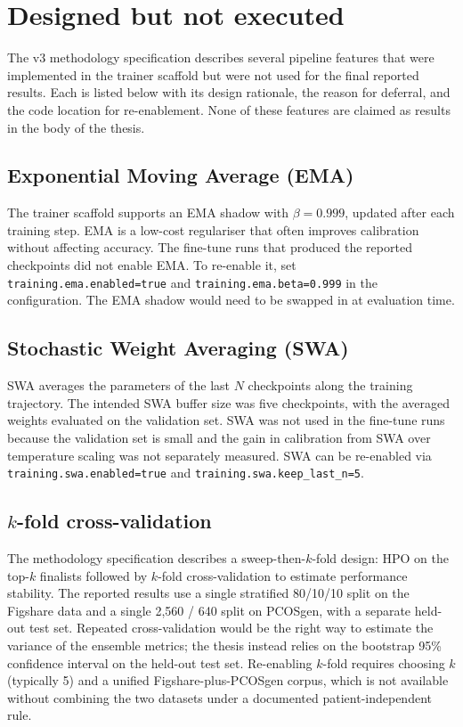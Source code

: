 \documentclass[../preamble.tex]{subfiles}
\begin{document}
\chapter{Designed but not executed}
\label{app:designed-not-executed}

The v3 methodology specification describes several pipeline features that
were implemented in the trainer scaffold but were not used for the final
reported results. Each is listed below with its design rationale, the reason
for deferral, and the code location for re-enablement. None of these features
are claimed as results in the body of the thesis.

\section{Exponential Moving Average (EMA)}
\label{app:designed-ema}

The trainer scaffold supports an EMA shadow with $\beta = 0.999$, updated
after each training step. EMA is a low-cost regulariser that often improves
calibration without affecting accuracy. The fine-tune runs that produced the
reported checkpoints did not enable EMA. To re-enable it, set
\texttt{training.ema.enabled=true} and \texttt{training.ema.beta=0.999} in
the configuration. The EMA shadow would need to be swapped in at evaluation
time.

\section{Stochastic Weight Averaging (SWA)}
\label{app:designed-swa}

SWA averages the parameters of the last $N$ checkpoints along the training
trajectory. The intended SWA buffer size was five checkpoints, with the
averaged weights evaluated on the validation set. SWA was not used in the
fine-tune runs because the validation set is small and the gain in
calibration from SWA over temperature scaling was not separately measured.
SWA can be re-enabled via \texttt{training.swa.enabled=true} and
\texttt{training.swa.keep\_last\_n=5}.

\section{$k$-fold cross-validation}
\label{app:designed-kfold}

The methodology specification describes a sweep-then-$k$-fold design: HPO on
the top-$k$ finalists followed by $k$-fold cross-validation to estimate
performance stability. The reported results use a single stratified 80/10/10
split on the Figshare data and a single 2{,}560 / 640 split on PCOSgen, with
a separate held-out test set. Repeated cross-validation would be the right
way to estimate the variance of the ensemble metrics; the thesis instead
relies on the bootstrap 95\% confidence interval on the held-out test set.
Re-enabling $k$-fold requires choosing $k$ (typically 5) and a unified
Figshare-plus-PCOSgen corpus, which is not available without combining the
two datasets under a documented patient-independent rule.
\end{document}
